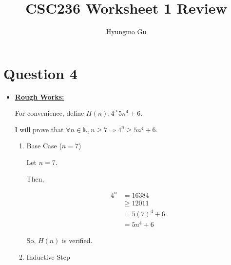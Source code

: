 \documentclass[12pt]{article}
\begin{document}
\title{CSC236 Worksheet 1 Review}
\author{Hyungmo Gu}
\maketitle

\section*{Question 4}
\begin{itemize}
    \item

    \begin{mdframed}
        \underline{\textbf{Rough Works:}}

        \bigskip

        For convenience, define $H(n): 4^ \geq 5n^4 + 6$.

        \bigskip

        I will prove that $\forall n \in \mathbb{N}, n \geq 7 \Rightarrow 4^n \geq 5n^4 + 6$.

        \begin{enumerate}[1.]
            \item Base Case ($n = 7$)

            \begin{mdframed}
            Let $n = 7$.

            \bigskip

            Then,

            \begin{align}
                4^n &= 16384\\
                &\geq 12011\\
                &= 5(7)^4 + 6\\
                &= 5n^4 + 6
            \end{align}

            \bigskip

            So, $H(n)$ is verified.
            \end{mdframed}

            \item Inductive Step
        \end{enumerate}

    \end{mdframed}

\end{itemize}
\end{document}
